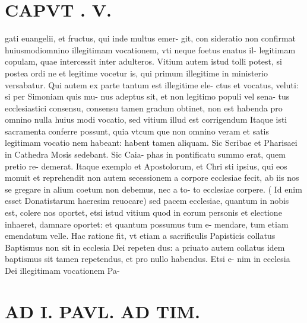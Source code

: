 \documentclass{article}
\begin{document}
\begin{pages}
\section*{CAPVT . V. }
\marginpar{[ p.365 ]}\pstart gati euangelii, et fructus, qui inde multus emer- git, con sideratio non confirmat huiusmodiomnino illegitimam vocationem, vti neque foetus enatus il- legitimam copulam, quae intercessit inter adulteros. Vitium autem istud tolli potest, si postea ordi ne et legitime vocetur is, qui primum illegitime in ministerio versabatur. Qui autem ex parte tantum est illegitime ele- ctus et vocatus, veluti: si per Simoniam quis mu- nus adeptus sit, et non legitimo populi vel sena- tus ecclesiastici consensu, consensu tamen gradum obtinet, non est habenda pro omnino nulla huius modi vocatio, sed vitium illud est corrigendum Itaque isti sacramenta conferre possunt, quia vtcum que non omnino veram et satis legitimam vocatio nem habeant: habent tamen aliquam. Sic Scribae et Pharisaei in Cathedra Mosis sedebant. Sic Caia- phas in pontificatu summo erat, quem pretio re- demerat. Itaque exemplo et Apostolorum, et Chri sti ipsius, qui eos monuit et reprehendit non autem secessionem a corpore ecclesiae fecit, ab iis nos se gregare in alium coetum non debemus, nec a to- to ecclesiae corpere. ( Id enim esset Donatistarum haeresim reuocare) sed pacem ecclesiae, quantum in nobis est, colere nos oportet, etsi istud vitium quod in eorum personis et electione inhaeret, damnare oportet: et quantum possumus tum e- mendare, tum etiam emendatum velle. Hac ratione fit, vt etiam a sacrificulis Papisticis collatus Baptismus non sit in ecclesia Dei repeten dus: a priuato autem collatus idem baptismus sit tamen repetendus, et pro nullo habendus. Etsi e- nim in ecclesia Dei illegitimam vocationem Pa-  \pend
\section*{AD I. PAVL. AD TIM. }
\marginpar{[ p.326 ]}\pstart {}
{}

\end{pages}
\end{document}
